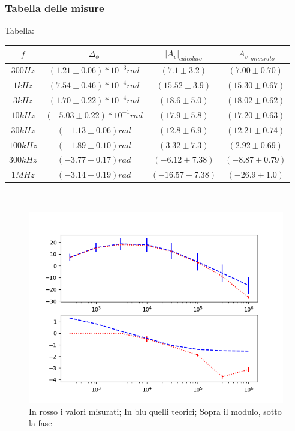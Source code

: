 \documentclass{article}
\begin{document}
\subsubsection{Tabella delle misure}
Tabella:
\\
\begin{table}[]
\centering
\label{my-label}
\renewcommand{\arraystretch}{1.5}
\begin{tabular}{|c|c|c|c|}
\hline $f$ & $\Delta_\phi$ & ${|A_v|}_{calcolato}$ & ${|A_v|}_{misurato}$
\\
\hline $300Hz$ & $(1.21 \pm 0.06)*10^{-3} rad$ & $(7.1 \pm 3.2) $ & $ (7.00 \pm 0.70) $\\
\hline $1kHz$ & $(7.54 \pm 0.46)*10^{-4} rad$ & $(15.52 \pm 3.9)$ & $ (15.30 \pm 0.67) $\\
\hline $3kHz$ & $(1.70 \pm 0.22)*10^{-4} rad$ & $(18.6 \pm 5.0)$ & $ (18.02 \pm 0.62) $\\
\hline $10kHz$ & $(-5.03 \pm 0.22)*10^{-1} rad$ & $(17.9 \pm 5.8)$ & $ (17.20 \pm 0.63) $\\
\hline $30kHz$ & $(-1.13 \pm 0.06) rad$ & $(12.8 \pm 6.9)$ & $ (12.21 \pm 0.74) $\\
\hline $100kHz$ & $(-1.89 \pm 0.10) rad$ & $(3.32 \pm 7.3)$ & $ (2.92 \pm 0.69) $\\
\hline $300kHz$ & $(-3.77 \pm 0.17) rad$ & $(-6.12 \pm 7.38)$ & $ (-8.87 \pm 0.79) $\\
\hline $1MHz$ & $(-3.14 \pm 0.19) rad$ & $(-16.57 \pm 7.38)$ & $ (-26.9 \pm 1.0) $\\
\hline
\end{tabular}
\\
\end{table}
\begin{figure}
  \includegraphics[width=\textwidth]{Bode.png}
  \caption{In rosso i valori misurati; In blu quelli teorici; Sopra il modulo, sotto la fase}
  \label{fig:bode1}
\end{figure}
\end{document}
